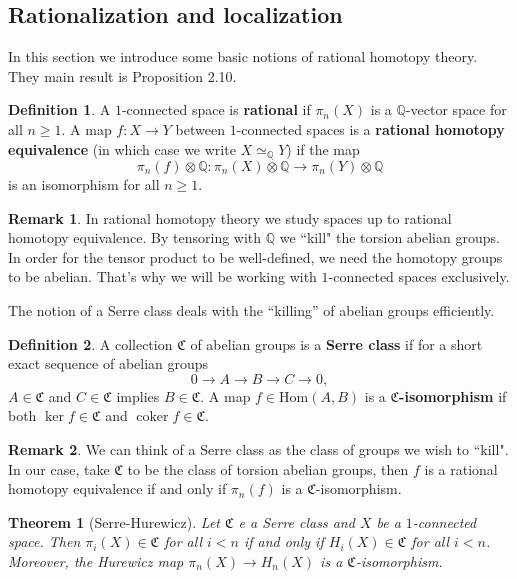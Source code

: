 \documentclass[psamsfonts]{amsart}
\newtheorem{thm}{Theorem}[section]
\theoremstyle{definition}
\newtheorem{defn}{Definition}[section]
\newtheorem{rem}{Remark}[section]
\newcommand{\Q}{\mathbb{Q}}
\newcommand{\Hom}{\mathrm{Hom}}
\DeclareMathOperator{\coker}{coker}
\numberwithin{equation}{section}
\begin{document}
\subsection{Rationalization and localization}

In this section we introduce some basic notions of rational homotopy theory. They main result is Proposition 2.10.

\begin{defn}
A $1$-connected space is \textbf{rational} if $\pi_n(X)$ is a $\Q$-vector space for all $n\geq1$. A map $f:X\to Y$ between $1$-connected spaces is a \textbf{rational homotopy equivalence} (in which case we write $X\simeq_\Q Y$) if the map
\[\pi_n(f)\otimes\Q:\pi_n(X)\otimes\Q\to\pi_n(Y)\otimes\Q\]
is an isomorphism for all $n\geq1$.
\end{defn}

\begin{rem}
In rational homotopy theory we study spaces up to rational homotopy equivalence. By tensoring with $\Q$ we ``kill" the torsion abelian groups. In order for the tensor product to be well-defined, we need the homotopy groups to be abelian. That's why we will be working with $1$-connected spaces exclusively. 
\end{rem}

The notion of a Serre class deals with the ``killing'' of abelian groups efficiently.

\begin{defn}
A collection $\mathfrak{C}$ of abelian groups is a \textbf{Serre class} if for a short exact sequence of abelian groups
\[0\rightarrow A\to B\to C\to0,\]
$A\in\mathfrak{C}$ and $C\in\mathfrak{C}$ implies $B\in\mathfrak{C}$. A map $f\in\Hom(A,B)$ is a \textbf{$\mathfrak{C}$-isomorphism} if both $\ker f\in\mathfrak{C}$ and $\coker f\in\mathfrak{C}$.
\end{defn}

\begin{rem}
We can think of a Serre class as the class of groups we wish to ``kill". In our case, take $\mathfrak{C}$ to be the class of torsion abelian groups, then $f$ is a rational homotopy equivalence if and only if $\pi_n(f)$ is a $\mathfrak{C}$-isomorphism.
\end{rem}

\begin{thm}[Serre-Hurewicz]
Let $\mathfrak{C}$ e a Serre class and $X$ be a $1$-connected space. Then $\pi_i(X)\in\mathfrak{C}$ for all $i<n$ if and only if $H_i(X)\in\mathfrak{C}$ for all $i<n$. Moreover, the Hurewicz map $\pi_n(X)\to H_n(X)$ is a $\mathfrak{C}$-isomorphism.
\end{thm}
\end{document}
